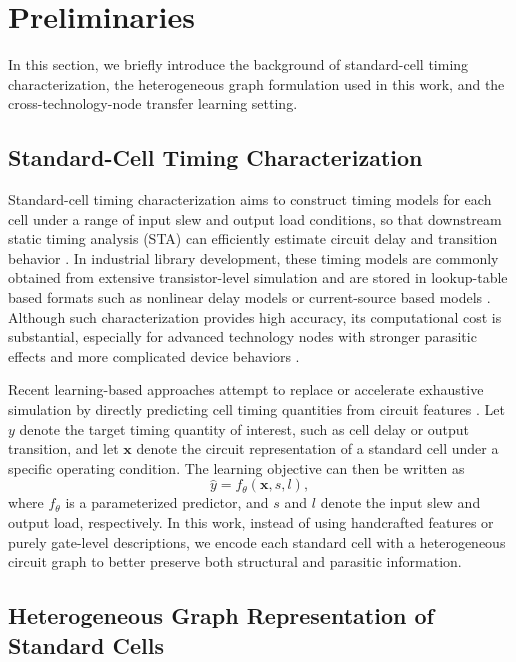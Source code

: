 \section{Preliminaries}
In this section, we briefly introduce the background of standard-cell timing characterization, the heterogeneous graph formulation used in this work, and the cross-technology-node transfer learning setting.

\subsection{Standard-Cell Timing Characterization}

Standard-cell timing characterization aims to construct timing models for each cell under a range of input slew and output load conditions, so that downstream static timing analysis (STA) can efficiently estimate circuit delay and transition behavior \cite{bhasker2009sta,garyfallou2021gate}. In industrial library development, these timing models are commonly obtained from extensive transistor-level simulation and are stored in lookup-table based formats such as nonlinear delay models or current-source based models \cite{amelifard2008csm,kaur2014ecsm}. Although such characterization provides high accuracy, its computational cost is substantial, especially for advanced technology nodes with stronger parasitic effects and more complicated device behaviors \cite{charafeddine2017curve,garyfallou2022ml}.

Recent learning-based approaches attempt to replace or accelerate exhaustive simulation by directly predicting cell timing quantities from circuit features \cite{klemme2021reliability,ebrahimipour2020aadam,ma2024gnn,liu2025gtncell}. Let $y$ denote the target timing quantity of interest, such as cell delay or output transition, and let $\mathbf{x}$ denote the circuit representation of a standard cell under a specific operating condition. The learning objective can then be written as
\begin{equation}
    \hat{y} = f_{\theta}(\mathbf{x}, s, l),
\end{equation}
where $f_{\theta}$ is a parameterized predictor, and $s$ and $l$ denote the input slew and output load, respectively. In this work, instead of using handcrafted features or purely gate-level descriptions, we encode each standard cell with a heterogeneous circuit graph to better preserve both structural and parasitic information.

\subsection{Heterogeneous Graph Representation of Standard Cells}

